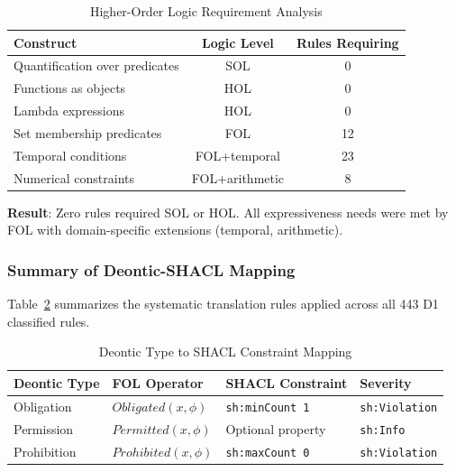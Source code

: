 \begin{table}[htbp]
\centering
\caption{Higher-Order Logic Requirement Analysis}
\label{tab:hol-analysis}
\begin{tabular}{|l|c|c|}
\hline
\textbf{Construct} & \textbf{Logic Level} & \textbf{Rules Requiring} \\
\hline
Quantification over predicates & SOL & 0 \\
Functions as objects & HOL & 0 \\
Lambda expressions & HOL & 0 \\
Set membership predicates & FOL & 12 \\
Temporal conditions & FOL+temporal & 23 \\
Numerical constraints & FOL+arithmetic & 8 \\
\hline
\end{tabular}
\end{table}

\textbf{Result}: Zero rules required SOL or HOL. All expressiveness needs were met by FOL with domain-specific extensions (temporal, arithmetic).


\subsubsection{Summary of Deontic-SHACL Mapping}

Table~\ref{tab:deontic-shacl-mapping} summarizes the systematic translation rules applied across all 443 D1 classified rules.

\begin{table}[htbp]
\centering
\caption{Deontic Type to SHACL Constraint Mapping}
\label{tab:deontic-shacl-mapping}
\begin{tabular}{|l|l|l|l|}
\hline
\textbf{Deontic Type} & \textbf{FOL Operator} & \textbf{SHACL Constraint} & \textbf{Severity} \\
\hline
Obligation & $Obligated(x, \phi)$ & \texttt{sh:minCount 1} & \texttt{sh:Violation} \\
Permission & $Permitted(x, \phi)$ & Optional property & \texttt{sh:Info} \\
Prohibition & $Prohibited(x, \phi)$ & \texttt{sh:maxCount 0} & \texttt{sh:Violation} \\
\hline
\end{tabular}
\end{table}

